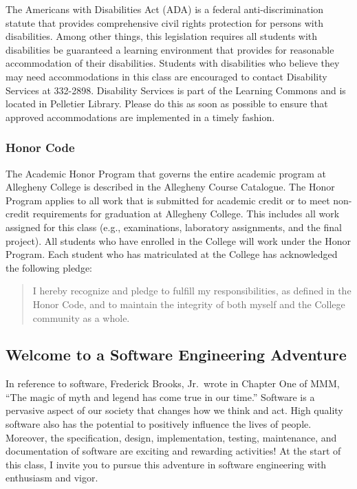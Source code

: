The Americans with Disabilities Act (ADA) is a federal anti-discrimination statute that provides comprehensive civil
rights protection for persons with disabilities.  Among other things, this legislation requires all students with
disabilities be guaranteed a learning environment that provides for reasonable accommodation of their disabilities.
Students with disabilities who believe they may need accommodations in this class are encouraged to contact Disability
Services at 332-2898.  Disability Services is part of the Learning Commons and is located in Pelletier Library.
Please do this as soon as possible to ensure that approved accommodations are implemented in a timely fashion.

\subsubsection*{Honor Code}

The Academic Honor Program that governs the entire academic program at Allegheny College is described in the Allegheny
Course Catalogue.  The Honor Program applies to all work that is submitted for academic credit or to meet non-credit
requirements for graduation at Allegheny College.  This includes all work assigned for this class (e.g., examinations,
laboratory assignments, and the final project).  All students who have enrolled in the College will work under the Honor
Program.  Each student who has matriculated at the College has acknowledged the following pledge:

\vspace*{-.1in}
\begin{quote}
I hereby recognize and pledge to fulfill my responsibilities, as defined in the Honor Code, and to maintain the
integrity of both myself and the College community as a whole.  
\end{quote}
\vspace*{-.15in}

\subsection*{Welcome to a Software Engineering Adventure}

In reference to software, Frederick Brooks, Jr.\ wrote in Chapter One of MMM, ``The magic of myth and legend has come true
in our time.'' Software is a pervasive aspect of our society that changes how we think and act.  High quality software
also has the potential to positively influence the lives of people. Moreover, the specification, design, implementation,
testing, maintenance, and documentation of software are exciting and rewarding activities!  At the start of this class,
I invite you to pursue this adventure in software engineering with enthusiasm and vigor.



